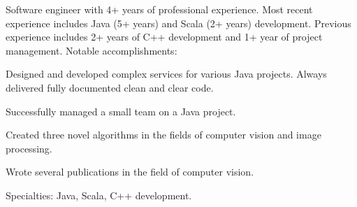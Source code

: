 

\begin{cvparagraph}
	Software engineer with 4+ years of professional experience. Most recent experience includes Java (5+ years) and Scala (2+ years) development. Previous experience includes 2+ years of C++ development and 1+ year of project management. Notable accomplishments:
      \begin{cvitems}
      \item{Designed and developed complex services for various Java projects. Always delivered fully documented clean and clear code.}
      \item{Successfully managed a small team on a Java project.}
      \item{Created three novel algorithms in the fields of computer vision and image processing.}
      \item{Wrote several publications in the field of computer vision.}
      \end{cvitems}
      Specialties: Java, Scala, C++ development.
\end{cvparagraph}
